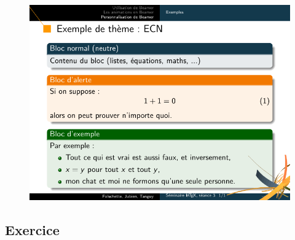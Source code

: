 \begin{frame}[plain]
\begin{figure}
  \centering
  \includegraphics[width=1\textwidth]{img/seance3_extheme_ecn}
\end{figure}
\end{frame}



\subsection{Exercice}

